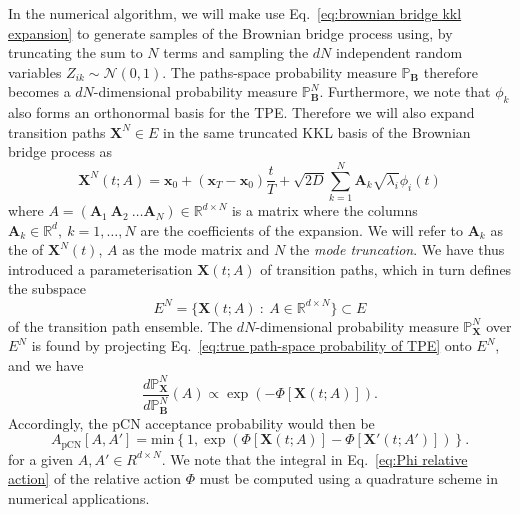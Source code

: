 In the numerical algorithm, we will make use Eq.~\ref{eq:brownian bridge kkl expansion} to generate samples of the Brownian bridge process using, by truncating the sum to $N$ terms and sampling the $d N$ independent random variables $Z_{ik} \sim \mathcal{N}(0, 1)$. The paths-space probability measure $\mathbb{P}_\mathbf{B}$ therefore becomes a $d N$-dimensional probability measure $\mathbb{P}^N_\mathbf{B}$. Furthermore, we note that $\phi_k$ also forms an orthonormal basis for the TPE. Therefore we will also expand transition paths $\mathbf{X}^N \in E$ in the same truncated KKL basis of the Brownian bridge process as
\begin{equation} \label{eq:KKL expansion of transition paths}
	\mathbf{X}^N(t;A) = \mathbf{x}_0 + (\mathbf{x}_T - \mathbf{x}_0) \frac{t}{T} +\sqrt{2 D} \sum_{k=1}^N \mathbf{A}_k \sqrt{\lambda_i} \phi_i(t)
\end{equation}
where $A = (\mathbf{A}_1\ \mathbf{A}_2\ \dots \mathbf{A}_N) \in \mathbb{R}^{d \times N}$ is a matrix where the columns $\mathbf{A}_k \in \mathbb{R}^d,\ k=1,\dots,N$ are the coefficients of the expansion. We will refer to $\mathbf{A}_k$ as the  of $\mathbf{X}^N(t)$, $A$ as the mode matrix and $N$ the \textit{mode truncation}. We have thus introduced a parameterisation $\mathbf{X}(t ; A)$ of transition paths, which in turn defines the subspace
\begin{equation}
	E^N = \{ \mathbf{X}(t;A)\ :\ A \in \mathbb{R}^{d \times N} \} \subset E
\end{equation}
of the transition path ensemble. The $d N$-dimensional probability measure $\mathbb{P}^N_\mathbf{X}$ over $E^N$ is found by projecting Eq.~\ref{eq:true path-space probability of TPE} onto $E^N$, and we have
\begin{equation}
	\frac{d \mathbb{P}^N_\mathbf{X}}{d \mathbb{P}^N_\mathbf{B}}(A) \propto \exp( - \Phi[\mathbf{X}(t;A)] ).
\end{equation}
Accordingly, the pCN acceptance probability would then be
\begin{equation} \label{eq:truncated pCN acceptance probability}
A_\text{pCN}[A, A'] = \text{min} \left\{ 1, 
\exp \left( \Phi[\mathbf{X}(t;A)] - \Phi[\mathbf{X}'(t;A')] \right)
\right\}.
\end{equation}
for a given $A, A' \in \mathbb{}R^{d \times N}$. We note that the integral in Eq.~\ref{eq:Phi relative action} of the relative action $\Phi$ must be computed using a quadrature scheme in numerical applications. %

